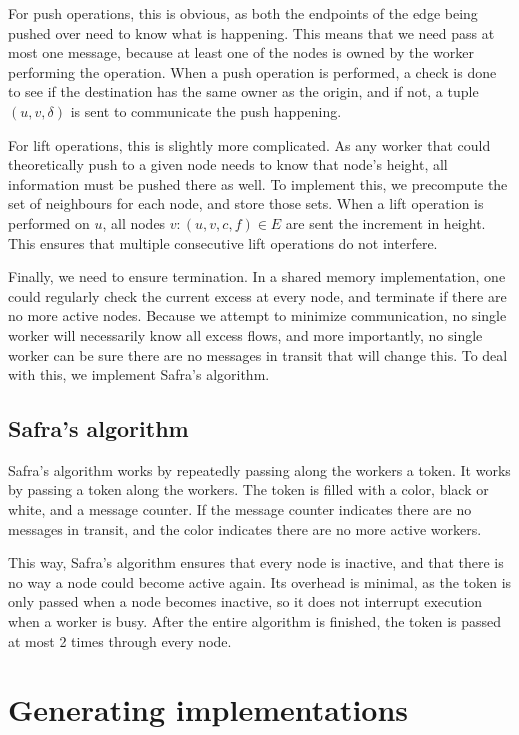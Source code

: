 For push operations, this is obvious, as both the endpoints of the edge being pushed over need to know what is happening. This means that we need pass at most one message, because at least one of the nodes is owned by the worker performing the operation. When a push operation is performed, a check is done to see if the destination has the same owner as the origin, and if not, a tuple $(u, v, \delta)$ is sent to communicate the push happening.

For lift operations, this is slightly more complicated. As any worker that could theoretically push to a given node needs to know that node's height, all information must be pushed there as well. To implement this, we precompute the set of neighbours for each node, and store those sets. When a lift operation is performed on $u$, all nodes $v : (u, v, c, f) \in E$ are sent the increment in height. This ensures that multiple consecutive lift operations do not interfere.

Finally, we need to ensure termination. In a shared memory implementation, one could regularly check the current excess at every node, and terminate if there are no more active nodes. Because we attempt to minimize communication, no single worker will necessarily know all excess flows, and more importantly, no single worker can be sure there are no messages in transit that will change this. To deal with this, we implement Safra's algorithm.

\subsection{Safra's algorithm}
\label{sec:safras-agorithm}

Safra's algorithm\cite{fokkink2013distributed} works by repeatedly passing along the workers a token. It works by passing a token along the workers. The token is filled with a color, black or white, and a message counter. If the message counter indicates there are no messages in transit, and the color indicates there are no more active workers.

This way, Safra's algorithm ensures that every node is inactive, and that there is no way a node could become active again. Its overhead is minimal, as the token is only passed when a node becomes inactive, so it does not interrupt execution when a worker is busy. After the entire algorithm is finished, the token is passed at most 2 times through every node.

\section{Generating implementations}
\label{sec:implementations}

